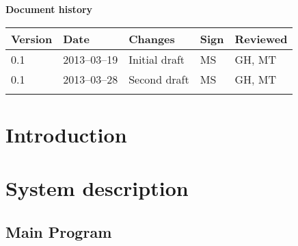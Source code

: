\documentclass[10pt, a4paper, twoside]{article}
\numberwithin{equation}{section}
\numberwithin{figure}{section}
\begin{document}



\newpage
\pagestyle{fancy}
\setcounter{page}{2} %




\newpage
\tableofcontents
\listoffigures



\newpage
\vspace*{5\baselineskip}

\begin{center}
\textbf{\LARGE Document history}

{ \footnotesize 
\begin{tabular}{|p{1cm}|p{2.0cm}|p{5cm}|p{1.5cm}|p{1.5cm}|}
	\hline
	\textbf{Version} & \textbf{Date} & \textbf{Changes} & \textbf{Sign} & \textbf{Reviewed} \\
	
	\hline
	0.1 & 2013--03--19 & Initial draft & MS & GH, MT\\
	
	\hline
	0.1 & 2013--03--28 & Second draft & MS & GH, MT\\
	
	\hline
	 &  &  &  &  \\
	
	\hline
\end{tabular}
}
\end{center}





%
%
\newpage
{}

\newpage
\section{Introduction}


\section{System description}


\newpage
\subsection{Main Program}

\end{document}
